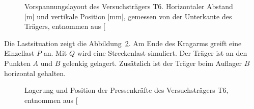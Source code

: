 \documentclass[
  11pt,
  letterpaper,
]{scrreprt}
\begin{document}
\begin{figure}[H]


\caption{\label{fig-vorspannung_t6}Vorspannungslayout des
Versuchsträgers T6. Horizontaler Abstand {[}m{]} und vertikale Position
{[}mm{]}, gemessen von der Unterkante des Trägers, entnommen aus
{[}\citeproc{ref-sigrist_versuche_1993}{5}{]}}

\end{figure}%

Die Lastsituation zeigt die Abbildung~\ref{fig-last_t6}. Am Ende des
Kragarms greift eine Einzellast \(P\) an. Mit \(Q\) wird eine
Streckenlast simuliert. Der Träger ist an den Punkten \(A\) und \(B\)
gelenkig gelagert. Zusätzlich ist der Träger beim Auflager \(B\)
horizontal gehalten.

\begin{figure}[H]


\caption{\label{fig-last_t6}Lagerung und Position der Pressenkräfte des
Versuchsträgers T6, entnommen aus
{[}\citeproc{ref-sigrist_versuche_1993}{5}{]}}

\end{figure}%
\end{document}
